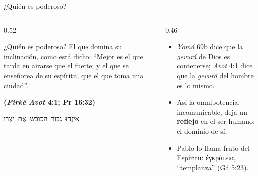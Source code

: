 \documentclass[hyperref={bookmarks=false},aspectratio=169]{beamer}
\newcommand{\heb}[1]{\mbox{\foreignlanguage{hebrew}{#1}}}
\newcommand{\grc}[1]{\foreignlanguage{ancientgreek}{#1}}
\newcommand{\fuente}[1]{\par\hfill{\upshape\bfseries\footnotesize\textcolor{azul}{#1}}}
\newcommand{\destacar}[1]{\textbf{\textcolor{azul}{#1}}}
\begin{document}
\begin{frame}{¿Quién es poderoso?}
\begin{columns}[c,onlytextwidth]
\begin{column}{0.52\textwidth}
\begin{cita}[colback=dorado!10!papiro,colframe=dorado!80!azul]¿Quién es poderoso? El que domina su inclinación, como está dicho: ``Mejor es el que tarda en airarse que el fuerte; y el que se enseñorea de su espíritu, que el que toma una ciudad''.\fuente{(\emph{Pirké Avot} 4:1; Pr 16:32)}\end{cita}
\begin{center}\scriptsize\heb{אֵיזֶהוּ גִבּוֹר הַכּוֹבֵשׁ אֶת יִצְרוֹ}\end{center}
\end{column}
\begin{column}{0.46\textwidth}\small
\begin{itemize}
\item \emph{Yomá} 69b dice que la \emph{gevurá} de Dios es contenerse; \emph{Avot} 4:1 dice que la \emph{gevurá} del hombre es lo mismo.
\item Así la omnipotencia, incomunicable, deja un \destacar{reflejo} en el ser humano: el dominio de sí.
\item Pablo lo llama fruto del Espíritu: \grc{ἐγκράτεια}, ``templanza'' (Gá 5:23).
\end{itemize}
\end{column}
\end{columns}
\end{frame}
\end{document}
